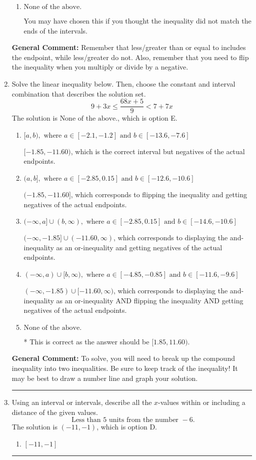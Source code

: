 \documentclass{extbook}[14pt]
\newcommand{\litem}[1]{\item #1

\rule{\textwidth}{0.4pt}}
\begin{document}
\begin{enumerate}
{\begin{enumerate}[label=\Alph*.]
 $[1.444, \infty)$, which corresponds to negating the endpoint of the solution.
\item \( \text{None of the above}. \)

You may have chosen this if you thought the inequality did not match the ends of the intervals.
\end{enumerate}

\textbf{General Comment:} Remember that less/greater than or equal to includes the endpoint, while less/greater do not. Also, remember that you need to flip the inequality when you multiply or divide by a negative.
}
\litem{
Solve the linear inequality below. Then, choose the constant and interval combination that describes the solution set.
\[ 9 + 3 x \leq \frac{68 x + 5}{9} < 7 + 7 x \]
The solution is \( \text{None of the above.} \), which is option E.\begin{enumerate}[label=\Alph*.]
\item \( [a, b), \text{ where } a \in [-2.1, -1.2] \text{ and } b \in [-13.6, -7.6] \)

$[-1.85, -11.60)$, which is the correct interval but negatives of the actual endpoints.
\item \( (a, b], \text{ where } a \in [-2.85, 0.15] \text{ and } b \in [-12.6, -10.6] \)

$(-1.85, -11.60]$, which corresponds to flipping the inequality and getting negatives of the actual endpoints.
\item \( (-\infty, a] \cup (b, \infty), \text{ where } a \in [-2.85, 0.15] \text{ and } b \in [-14.6, -10.6] \)

$(-\infty, -1.85] \cup (-11.60, \infty)$, which corresponds to displaying the and-inequality as an or-inequality and getting negatives of the actual endpoints.
\item \( (-\infty, a) \cup [b, \infty), \text{ where } a \in [-4.85, -0.85] \text{ and } b \in [-11.6, -9.6] \)

$(-\infty, -1.85) \cup [-11.60, \infty)$, which corresponds to displaying the and-inequality as an or-inequality AND flipping the inequality AND getting negatives of the actual endpoints.
\item \( \text{None of the above.} \)

* This is correct as the answer should be $[1.85, 11.60)$.
\end{enumerate}

\textbf{General Comment:} To solve, you will need to break up the compound inequality into two inequalities. Be sure to keep track of the inequality! It may be best to draw a number line and graph your solution.
}
\litem{
Using an interval or intervals, describe all the $x$-values within or including a distance of the given values.
\[ \text{ Less than } 5 \text{ units from the number } -6. \]
The solution is \( (-11, -1) \), which is option D.\begin{enumerate}[label=\Alph*.]
\item \( [-11, -1] \)


\end{enumerate}}
\end{enumerate}
\end{document}

